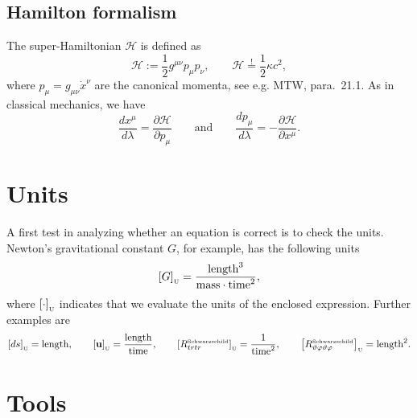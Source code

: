 \documentclass[10pt,twoside,notitlepage,a4paper,fleqn,openbib]{report}
\def\defequal{:=}
\def\uLength{\textrm{length}}
\def\uMass{\textrm{mass}}
\def\uTime{\textrm{time}}
\newcommand{\evalUnits}[1]{\left[#1\right]_{\text{\tiny U}}}
\begin{document}
\subsection{Hamilton formalism}\label{subsec:Hamilton}
The super-Hamiltonian $\mathcal{H}$ is defined as
\begin{equation}
  \mathcal{H} \defequal \frac{1}{2}g^{\mu\nu}p_{\mu}p_{\nu},\qquad \mathcal{H}\stackrel{!}{=}\frac{1}{2}\kappa c^2,
\end{equation}
where $p_{\mu}=g_{\mu\nu}\dot{x}^{\nu}$ are the canonical momenta, see e.g. MTW\cite{mtw}, para.~21.1. As in classical mechanics, we have
\begin{equation}
   \frac{dx^{\mu}}{d\lambda}=\frac{\partial\mathcal{H}}{\partial p_{\mu}}\qquad\text{and}\qquad \frac{dp_{\mu}}{d\lambda}=-\frac{\partial\mathcal{H}}{\partial x^{\mu}}.
\end{equation}

\section{Units}\label{sec:units}
\setcounter{equation}{0}
A first test in analyzing whether an equation is correct is to check the units. Newton's gravitational constant $G$, for example, has the following units
\begin{equation}
 \evalUnits{G} = \frac{\uLength^3}{\uMass\cdot\uTime^2},
\end{equation}
where $\evalUnits{\cdot}$ indicates that we evaluate the units of the enclosed expression. Further examples are
\begin{equation}
 \evalUnits{ds} = \uLength,\qquad \evalUnits{\mathbf{u}} = \frac{\uLength}{\uTime},\qquad\evalUnits{R_{trtr}^{\text{\tiny Schwarzschild}}} = \frac{1}{\uTime^2},\qquad\evalUnits{R_{\vartheta\varphi\vartheta\varphi}^{\text{\tiny Schwarzschild}}} = \uLength^2.
\end{equation}


\section{Tools}\label{sec:tools}
\setcounter{equation}{0}
\end{document}
